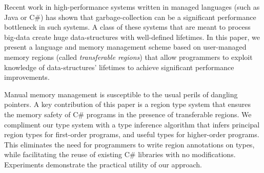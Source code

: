 Recent work in high-performance systems written in managed languages
(such as Java or C\#) has shown that garbage-collection can be a
significant performance bottleneck in such systems. A class of these
systems that are meant to process big-data create huge data-structures
with well-defined lifetimes. In this paper, we present a language and
memory management scheme based on user-managed memory regions (called
\emph{transferable regions}) that allow programmers to exploit
knowledge of data-structures' lifetimes to achieve significant
performance improvements.

Manual memory management is susceptible to the usual perils of
dangling pointers.  A key contribution of this paper is a region type
system that ensures the memory safety of C\# programs in the presence
of transferable regions. We compliment our type system with a type
inference algorithm that infers principal region types for first-order
programs, and useful types for higher-order programs. This eliminates
the need for programmers to write region annotations on types, while
facilitating the reuse of existing C\# libraries with no
modifications. Experiments demonstrate the practical utility of our
approach.

